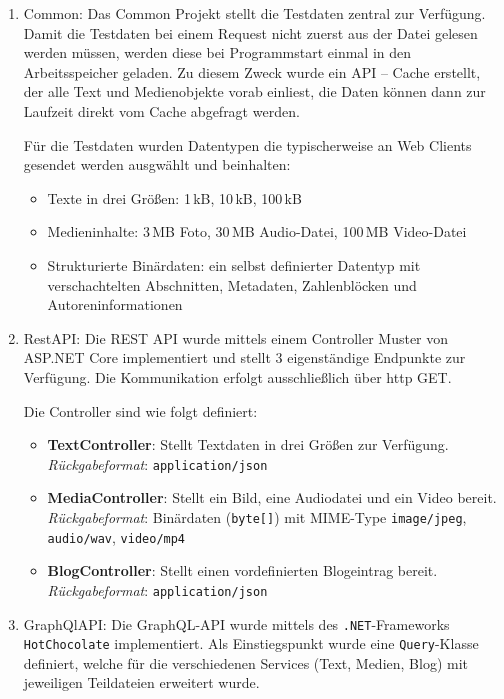 \begin{enumerate}
\item Common:
Das Common Projekt stellt die Testdaten zentral zur Verfügung. Damit die Testdaten bei einem Request nicht zuerst aus der Datei gelesen werden müssen, werden diese bei Programmstart einmal in den Arbeitsspeicher geladen. Zu diesem Zweck wurde ein API – Cache erstellt, der alle Text und Medienobjekte vorab einliest, die Daten können dann zur Laufzeit direkt vom Cache abgefragt werden.
 
Für die Testdaten wurden Datentypen die typischerweise an Web Clients gesendet werden ausgwählt und beinhalten:


\begin{itemize}
	\item Texte in drei Größen: 1\,kB, 10\,kB, 100\,kB
	\item Medieninhalte: 3\,MB Foto, 30\,MB Audio-Datei, 100\,MB Video-Datei
	\item Strukturierte Binärdaten: ein selbst definierter Datentyp mit verschachtelten Abschnitten, Metadaten, Zahlenblöcken und Autoreninformationen
\end{itemize}
\item RestAPI:
Die REST API wurde mittels einem Controller Muster von ASP.NET Core implementiert und stellt 3 eigenständige Endpunkte zur Verfügung. Die Kommunikation erfolgt ausschließlich über http GET.

Die Controller sind wie folgt definiert:

\begin{itemize}
	\item \textbf{TextController}: Stellt Textdaten in drei Größen zur Verfügung.\\
	\emph{Rückgabeformat}: \texttt{application/json}
	\item \textbf{MediaController}: Stellt ein Bild, eine Audiodatei und ein Video bereit.\\
	\emph{Rückgabeformat}: Binärdaten (\texttt{byte[]}) mit MIME-Type \texttt{image/jpeg}, \texttt{audio/wav}, \texttt{video/mp4}
	\item \textbf{BlogController}: Stellt einen vordefinierten Blogeintrag bereit.\\
	\emph{Rückgabeformat}: \texttt{application/json}
\end{itemize}

\item GraphQlAPI:
Die GraphQL-API wurde mittels des \texttt{.NET}-Frameworks \texttt{HotChocolate} implementiert.
Als Einstiegspunkt wurde eine \texttt{Query}-Klasse definiert, welche für die verschiedenen Services (Text, Medien, Blog) mit jeweiligen Teildateien erweitert wurde.


\end{enumerate}
